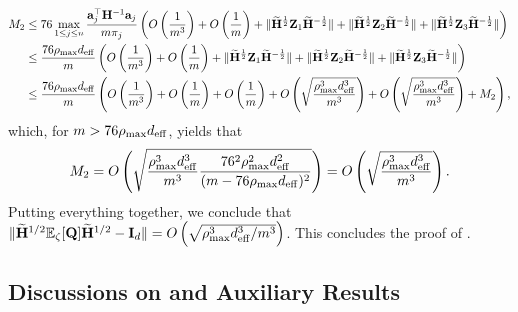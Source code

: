\documentclass[11pt,a4paper]{article}
\begin{document}
\begin{align}
 M_2&\leq 76 \max\limits_{1\leq j\leq n}\frac{\mathbf{a}_j^\top \mathbf{H}^{-1}\mathbf{a}_j}{m\pi_{j}}\left(O\left(\frac{1}{m^3}\right)+ O\left(\frac{1}{m}\right)+ \|\widetilde{\mathbf{H}}^{\frac{1}{2}}\mathbf{Z}_1\widetilde{\mathbf{H}}^{-\frac{1}{2}}\|+ \|\widetilde{\mathbf{H}}^{\frac{1}{2}}\mathbf{Z}_2\widetilde{\mathbf{H}}^{-\frac{1}{2}}\|+ \|\widetilde{\mathbf{H}}^{\frac{1}{2}}\mathbf{Z}_3\widetilde{\mathbf{H}}^{-\frac{1}{2}}\|\right)\nonumber\\
&\leq  \frac{76\rho_{\max} d_{\mathrm{eff}}}{m}\left(O\left(\frac{1}{m^3}\right)+ O\left(\frac{1}{m}\right)+ \|\widetilde{\mathbf{H}}^{\frac{1}{2}}\mathbf{Z}_1\widetilde{\mathbf{H}}^{-\frac{1}{2}}\|+ \|\widetilde{\mathbf{H}}^{\frac{1}{2}}\mathbf{Z}_2\widetilde{\mathbf{H}}^{-\frac{1}{2}}\|+ \|\widetilde{\mathbf{H}}^{\frac{1}{2}}\mathbf{Z}_3\widetilde{\mathbf{H}}^{-\frac{1}{2}}\|\right)\nonumber\\
&\leq \frac{76\rho_{\max} d_{\mathrm{eff}}}{m}\left(O\left(\frac{1}{m^3}\right)+O\left(\frac{1}{m}\right)+ O\left(\frac{1}{m}\right)+O\left(\sqrt{\frac{\rho_{\max}^3 d^3_{\mathrm{eff}}}{m^3}}\right)
+O\left(\sqrt{\frac{\rho_{\max}^3 d^3_{\mathrm{eff}}}{m^3}}\right)+ M_2\right),\nonumber
\end{align}
which, for $m>76\rho_{\max} d_{\mathrm{eff}}$, yields that
\begin{align}
 M_2 = O\left(\sqrt{\frac{\rho_{\max}^3 d^3_{\mathrm{eff}}}{m^3}\frac{76^2\rho_{\max}^2 d^2_{\mathrm{eff}}}{(m-76 \rho_{\max} d_{\mathrm{eff}})^2}}\right)=O \left(\sqrt{\frac{\rho_{\max}^3 d^3_{\mathrm{eff}}} {m^3}} \right).\nonumber 
\end{align}
Putting everything together, we conclude that $\|\widetilde{\mathbf{H}}^{1/2}{\mathbb{E}}_{\zeta}[\mathbf{Q} ]\widetilde{\mathbf{H}}^{1/2}-\mathbf{I}_d\|=O\left(\sqrt{\rho_{\max}^3 d^3_{\mathrm{eff}}/m^3}\right)$.
This concludes the proof of .
\qedwhite



\subsection{Discussions on  and Auxiliary Results}
\label{subsec:discussion_theo:inverse-bias}
\end{document}

